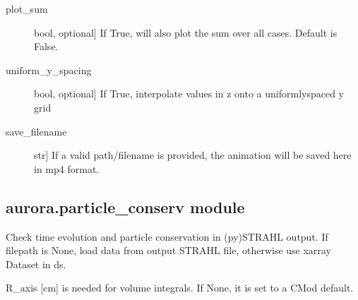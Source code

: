 \documentclass[letterpaper,10pt,english]{sphinxmanual}
\begin{document}
\begin{fulllineitems}
\begin{description}
\begin{description}
\item[{plot\_sum}] \leavevmode{[}bool, optional{]}
If True, will also plot the sum over all  cases. Default is False.

\item[{uniform\_y\_spacing}] \leavevmode{[}bool, optional{]}
If True, interpolate values in z onto a uniformly\sphinxhyphen{}spaced y grid

\item[{save\_filename}] \leavevmode{[}str{]}
If a valid path/filename is provided, the animation will be saved here in mp4 format.

\end{description}

\end{description}

\end{fulllineitems}



\subsection{aurora.particle\_conserv module}
\label{\detokenize{aurora:module-aurora.particle_conserv}}\label{\detokenize{aurora:aurora-particle-conserv-module}}

\begin{fulllineitems}
\label{\detokenize{aurora:aurora.particle_conserv.get_particle_nums}}
Check time evolution and particle conservation in (py)STRAHL output.
If filepath is None, load data from output STRAHL file, otherwise use xarray Dataset in ds.

R\_axis {[}cm{]} is needed for volume integrals. If None, it is set to a C\sphinxhyphen{}Mod default.

\end{fulllineitems}
\end{document}
